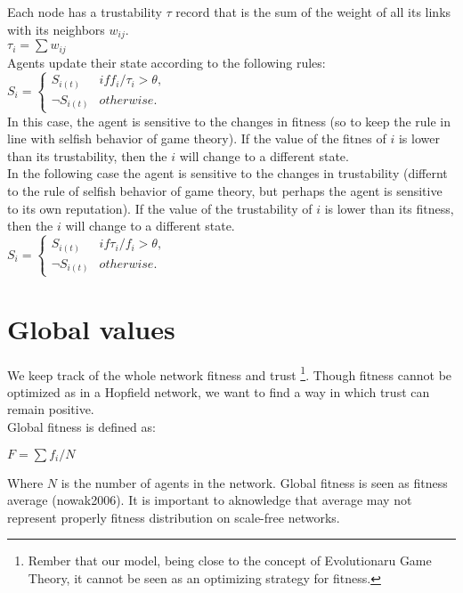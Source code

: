 \documentclass[11pt]{article} \usepackage{amsmath}
\begin{document}
Each node has a trustability $\tau$ record that is the sum of the weight of all its links with its neighbors $w_{ij}$.\\

$\tau_{i} = \sum w_{ij}$\\

Agents update their state according to the following rules:\\

$S_{i} = \begin{cases} S_{i(t)} & if  f_{i}/\tau_{i} > \theta,\\
  \neg S_{i(t)} &  otherwise. \end{cases} $\\

In this case, the agent is sensitive to the changes in fitness (so to keep the rule in line with selfish behavior of game theory). If the value of the fitnes of $i$ is lower than its trustability, then the $i$ will change to a different state.\\

In the following case the agent is sensitive to the changes in trustability (differnt to the rule of selfish behavior of game theory, but perhaps the agent is sensitive to its own reputation). If the value of the trustability of $i$ is lower than its fitness, then the $i$ will change to a different state.\\

$S_{i} = \begin{cases} S_{i(t)} & if  \tau_{i}/f_{i} > \theta,\\
  \neg S_{i(t)} &  otherwise. \end{cases} $\\

\section{Global values}

We keep track of the whole network fitness and trust \footnote{Rember that our model, being close to the concept of Evolutionaru Game Theory, it cannot be seen as an optimizing strategy for fitness.}. Though fitness cannot be optimized as in a Hopfield network, we want to find a way in which trust can remain positive.\\

Global fitness is defined as:

$F = \sum f_{i}/N$

Where $N$ is the number of agents in the network. Global fitness is seen as fitness average (nowak2006). It is important to aknowledge that average may not represent properly fitness distribution on scale-free networks.\\
\end{document}

